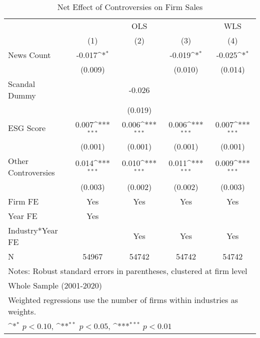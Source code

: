 \begin{table}[htbp]\centering
\def\sym#1{\ifmmode^{#1}\else\(^{#1}\)\fi}
\caption{Net Effect of Controversies on Firm Sales}
\begin{tabular}{l*{4}{c}}
\toprule
                    &\multicolumn{3}{c}{OLS}                                          &\multicolumn{1}{c}{WLS}\\\cmidrule(lr){2-4}\cmidrule(lr){5-5}
                    &\multicolumn{1}{c}{(1)}         &\multicolumn{1}{c}{(2)}         &\multicolumn{1}{c}{(3)}         &\multicolumn{1}{c}{(4)}         \\
\midrule
News Count          &      -0.017\sym{*}  &                     &      -0.019\sym{*}  &      -0.025\sym{*}  \\
                    &     (0.009)         &                     &     (0.010)         &     (0.014)         \\
\addlinespace
Scandal Dummy       &                     &      -0.026         &                     &                     \\
                    &                     &     (0.019)         &                     &                     \\
\addlinespace
ESG Score           &       0.007\sym{***}&       0.006\sym{***}&       0.006\sym{***}&       0.007\sym{***}\\
                    &     (0.001)         &     (0.001)         &     (0.001)         &     (0.001)         \\
\addlinespace
Other Controversies &       0.014\sym{***}&       0.010\sym{***}&       0.011\sym{***}&       0.009\sym{***}\\
                    &     (0.003)         &     (0.002)         &     (0.002)         &     (0.003)         \\
\midrule
Firm FE             &         Yes         &         Yes         &         Yes         &         Yes         \\
Year FE             &         Yes         &                     &                     &                     \\
Industry*Year FE    &                     &         Yes         &         Yes         &         Yes         \\
N                   &       54967         &       54742         &       54742         &       54742         \\
\bottomrule
\multicolumn{5}{l}{\footnotesize Notes: Robust standard errors in parentheses, clustered at firm level}\\
\multicolumn{5}{l}{\footnotesize Whole Sample (2001-2020)}\\
\multicolumn{5}{l}{\footnotesize Weighted regressions use the number of firms within industries as weights.}\\
\multicolumn{5}{l}{\footnotesize \sym{*} \(p<0.10\), \sym{**} \(p<0.05\), \sym{***} \(p<0.01\)}\\
\end{tabular}
\end{table}
